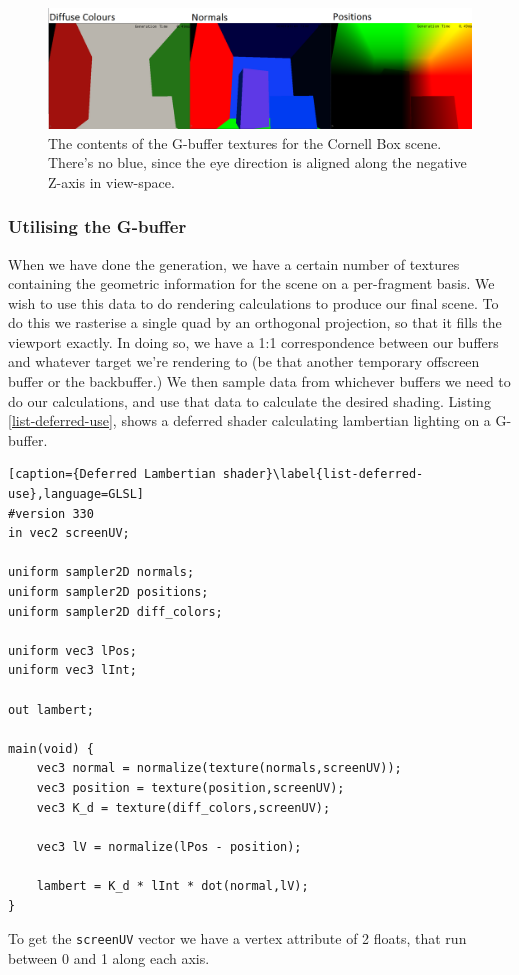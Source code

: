 \begin{figure}[!ht]
  \centering
    \includegraphics[width=1.0\textwidth]{img/def-rend/all}
    \caption{The contents of the G-buffer textures for the Cornell Box scene. There's no blue, since the eye direction is aligned along the negative Z-axis in view-space.}
    \label{fig-deferred}
\end{figure}

\subsubsection{Utilising the G-buffer}

When we have done the generation, we have a certain number of textures containing the geometric information for the scene on a per-fragment basis. We wish to use this data to do rendering calculations to produce our final scene. To do this we rasterise a single quad by an orthogonal projection, so that it fills the viewport exactly. In doing so, we have a 1:1 correspondence between our buffers and whatever target we're rendering to (be that another temporary offscreen buffer or the backbuffer.) We then sample data from whichever buffers we need to do our calculations, and use that data to calculate the desired shading. Listing \ref{list-deferred-use}, shows a deferred shader calculating lambertian lighting on a G-buffer.

\begin{lstlisting}[caption={Deferred Lambertian shader}\label{list-deferred-use},language=GLSL]
#version 330
in vec2 screenUV;

uniform sampler2D normals;
uniform sampler2D positions;
uniform sampler2D diff_colors;

uniform vec3 lPos;
uniform vec3 lInt;

out lambert;

main(void) {
	vec3 normal = normalize(texture(normals,screenUV));
	vec3 position = texture(position,screenUV);
	vec3 K_d = texture(diff_colors,screenUV);

	vec3 lV = normalize(lPos - position);
	
	lambert = K_d * lInt * dot(normal,lV);
}
\end{lstlisting}
To get the \verb?screenUV? vector we have a vertex attribute of 2 floats, that run between 0 and 1 along each axis.

